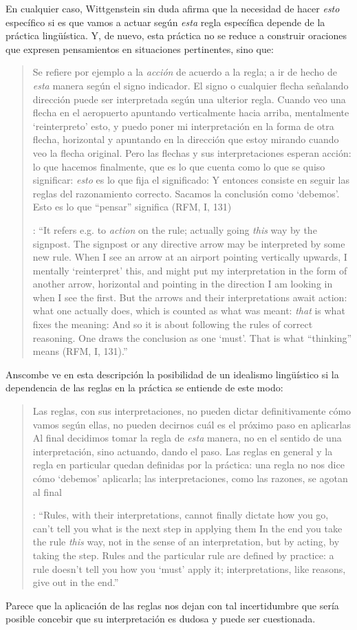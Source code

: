 En cualquier caso, Wittgenstein sin duda afirma que la necesidad de hacer \emph{esto} específico si es que vamos a actuar según \emph{esta} regla específica depende de la práctica lingüística. Y, de nuevo, esta práctica no se reduce a construir oraciones que expresen pensamientos en situaciones pertinentes, sino que: \blockquote[{\cite[131]{anscombe1981parmenides:qli}}: \enquote{It refers e.g. to \emph{action} on the rule; actually going \emph{this} way by the signpost. The signpost or any directive arrow may be interpreted by some new rule. When I see an arrow at an airport pointing vertically upwards, I mentally `reinterpret' this, and might put my interpretation in the form of another arrow, horizontal and pointing in the direction I am looking in when I see the first. But the arrows and their interpretations await action: what one actually does, which is counted as what was meant: \emph{that} is what fixes the meaning: And so it is about following the rules of correct reasoning. One draws the conclusion as one `must'. That is what ``thinking'' means (RFM, I, 131).}]{Se refiere por ejemplo a la \emph{acción} de acuerdo a la regla; a ir de hecho de \emph{esta} manera según el signo indicador. El signo o cualquier flecha señalando dirección puede ser interpretada según una ulterior regla. Cuando veo una flecha en el aeropuerto apuntando verticalmente hacia arriba, mentalmente `reinterpreto' esto, y puedo poner mi interpretación en la forma de otra flecha, horizontal y apuntando en la dirección que estoy mirando cuando veo la flecha original. Pero las flechas y sus interpretaciones esperan acción: lo que hacemos finalmente, que es lo que cuenta como lo que se quiso significar: \emph{esto} es lo que fija el significado: Y entonces consiste en seguir las reglas del razonamiento correcto. Sacamos la conclusión como `debemos'. Esto es lo que ``pensar'' significa (RFM, I, 131)}. Anscombe ve en esta descripción la posibilidad de un idealismo lingüístico si la dependencia de las reglas en la práctica se entiende de este modo: \blockquote[{\cite[131]{anscombe1981parmenides:qli}}: \enquote{Rules, with their interpretations, cannot finally dictate how you go, can't tell you what is the next step in applying them \textelp{} In the end you take the rule \emph{this} way, not in the sense of an interpretation, but by acting, by taking the step. Rules and the particular rule are defined by practice: a rule doesn't tell you how you `must' apply it; interpretations, like reasons, give out in the end.}]{Las reglas, con sus interpretaciones, no pueden dictar definitivamente cómo vamos según ellas, no pueden decirnos cuál es el próximo paso en aplicarlas \textelp{} Al final decidimos tomar la regla de \emph{esta} manera, no en el sentido de una interpretación, sino actuando, dando el paso. Las reglas en general y la regla en particular quedan definidas por la práctica: una regla no nos dice cómo `debemos' aplicarla; las interpretaciones, como las razones, se agotan al final}. Parece que la aplicación de las reglas nos dejan con tal incertidumbre que sería posible concebir que su interpretación es dudosa y puede ser cuestionada.
